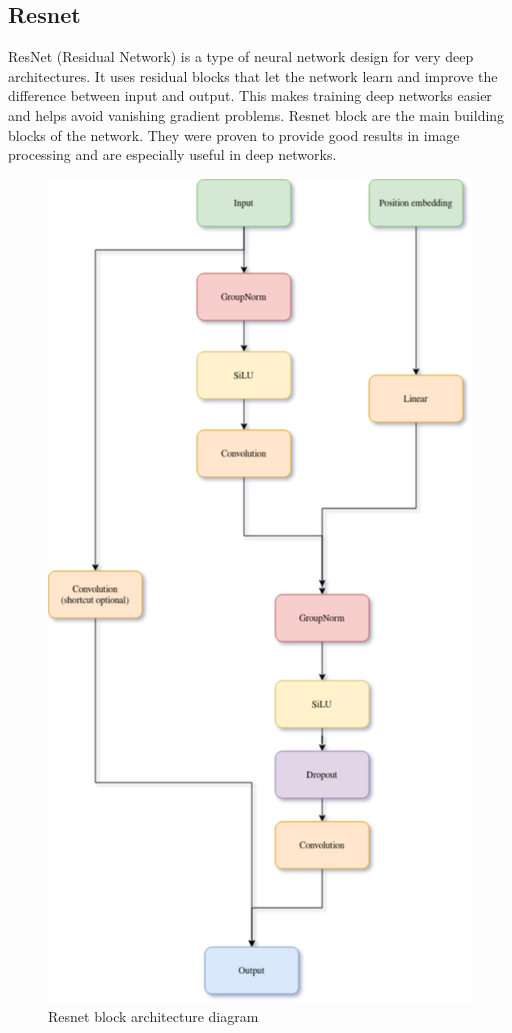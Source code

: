 \documentclass[11pt,a4paper]{report}
\begin{document}
\subsection{Resnet}
ResNet (Residual Network) is a type of neural network design for very deep architectures. It uses residual blocks that let the network learn and improve the difference between input and output. This makes training deep networks easier and helps avoid vanishing gradient problems. \cite{Resnet} Resnet block are the main building blocks of the network. They were proven to provide good results in image processing and are especially useful in deep networks.


\begin{figure}[H]
	\centering
	\includegraphics[scale=0.6]{images/ResnetBlock.drawio}
    \caption{Resnet block architecture diagram}
\end{figure}
\end{document}
